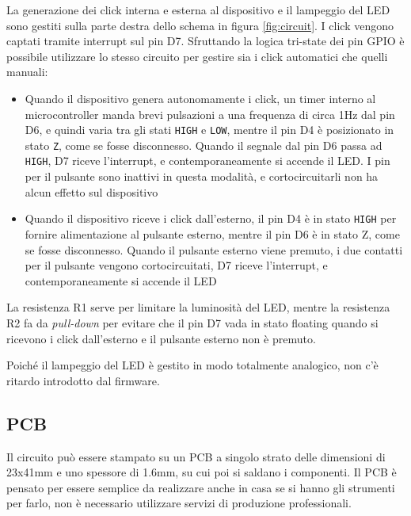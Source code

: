 La generazione dei click interna e esterna al dispositivo e il lampeggio del LED sono gestiti sulla parte destra dello schema in figura \ref{fig:circuit}. I click vengono captati tramite interrupt sul pin D7. Sfruttando la logica tri-state dei pin GPIO è possibile utilizzare lo stesso circuito per gestire sia i click automatici che quelli manuali:
\begin{itemize}
	\item Quando il dispositivo genera autonomamente i click, un timer interno al microcontroller manda brevi pulsazioni a una frequenza di circa 1Hz dal pin D6, e quindi varia tra gli stati \texttt{HIGH} e \texttt{LOW}, mentre il pin D4 è posizionato in stato \texttt{Z}, come se fosse disconnesso. Quando il segnale dal pin D6 passa ad \texttt{HIGH}, D7 riceve l'interrupt, e contemporaneamente si accende il LED. I pin per il pulsante sono inattivi in questa modalità, e cortocircuitarli non ha alcun effetto sul dispositivo
	\item Quando il dispositivo riceve i click dall'esterno, il pin D4 è in stato \texttt{HIGH} per fornire alimentazione al pulsante esterno, mentre il pin D6 è in stato Z, come se fosse disconnesso. Quando il pulsante esterno viene premuto, i due contatti per il pulsante vengono cortocircuitati, D7 riceve l'interrupt, e contemporaneamente si accende il LED
\end{itemize}

La resistenza R1 serve per limitare la luminosità del LED, mentre la resistenza R2 fa da \textit{pull-down} per evitare che il pin D7 vada in stato floating quando si ricevono i click dall'esterno e il pulsante esterno non è premuto.

Poiché il lampeggio del LED è gestito in modo totalmente analogico, non c'è ritardo introdotto dal firmware.

\subsection{PCB}
Il circuito può essere stampato su un PCB a singolo strato delle dimensioni di 23x41mm e uno spessore di 1.6mm, su cui poi si saldano i componenti. Il PCB è pensato per essere semplice da realizzare anche in casa se si hanno gli strumenti per farlo, non è necessario utilizzare servizi di produzione professionali.


